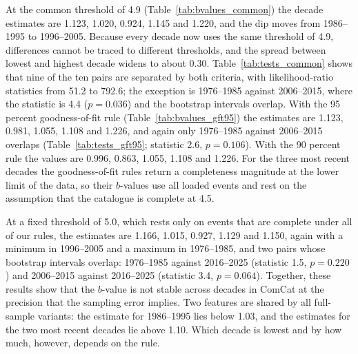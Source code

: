 \documentclass[11pt]{article}
\begin{document}
At the common threshold of 4.9 (Table~\ref{tab:bvalues_common}) the decade estimates are 1.123, 1.020, 0.924, 1.145 and 1.220, and the dip moves from 1986--1995 to 1996--2005. Because every decade now uses the same threshold of 4.9, differences cannot be traced to different thresholds, and the spread between lowest and highest decade widens to about 0.30.
Table~\ref{tab:tests_common} shows that nine of the ten pairs are separated by both criteria, with likelihood-ratio statistics from 51.2 to 792.6; the exception is 1976--1985 against 2006--2015, where the statistic is 4.4 ($p = 0.036$) and the bootstrap intervals overlap.
With the 95 percent goodness-of-fit rule (Table~\ref{tab:bvalues_gft95}) the estimates are 1.123, 0.981, 1.055, 1.108 and 1.226, and again only 1976--1985 against 2006--2015 overlaps (Table~\ref{tab:tests_gft95}; statistic 2.6, $p = 0.106$). With the 90 percent rule the values are 0.996, 0.863, 1.055, 1.108 and 1.226. For the three most recent decades the goodness-of-fit rules return a completeness magnitude at the lower limit of the data, so their $b$-values use all loaded events and rest on the assumption that the catalogue is complete at 4.5.






At a fixed threshold of 5.0, which rests only on events that are complete under all of our rules, the estimates are 1.166, 1.015, 0.927, 1.129 and 1.150, again with a minimum in 1996--2005 and a maximum in 1976--1985, and two pairs whose bootstrap intervals overlap: 1976--1985 against 2016--2025 (statistic 1.5, $p = 0.220$) and 2006--2015 against 2016--2025 (statistic 3.4, $p = 0.064$).
Together, these results show that the $b$-value is not stable across decades in ComCat at the precision that the sampling error implies. Two features are shared by all full-sample variants: the estimate for 1986--1995 lies below 1.03, and the estimates for the two most recent decades lie above 1.10. Which decade is lowest and by how much, however, depends on the rule.
\end{document}
